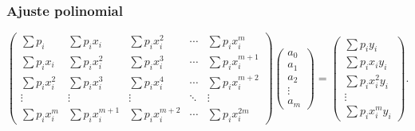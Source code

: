 \subsubsection{Ajuste polinomial}

\begin{equation}
\left(\begin{array}{ccccc}
\sum p_i & \sum p_ix_i &  \sum p_ix_i^2 & \cdots & \sum p_ix_i^m \\
\sum p_ix_i &  \sum p_ix_i^2 &  \sum p_ix_i^3 & \cdots & \sum p_ix_i^{m+1} \\
\sum p_ix^2_i &  \sum p_ix_i^3 &  \sum p_ix_i^4 & \cdots & \sum p_ix_i^{m+2} \\
\vdots & \vdots & \vdots & \ddots & \vdots \\
\sum p_ix_i^m &  \sum p_ix_i^{m+1}&  \sum p_ix_i^{m+2} & \cdots & \sum p_ix_i^{2m}
\end{array}
\right)\left(\begin{array}{c}a_0\\a_1\\a_2\\ \vdots\\a_m\end{array}\right)
=\left(\begin{array}{c}
\sum p_iy_i\\ \sum p_ix_iy_i\\ \sum p_ix_i^2y_i\\ \vdots\\ \sum p_ix_i^m y_i\end{array}\right).
\end{equation}

